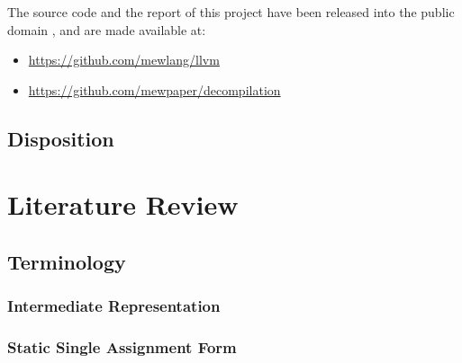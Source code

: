 \documentclass[12pt, a4paper]{article}
\begin{document}
The source code and the report of this project have been released into the
public domain \cite{cc0}, and are made available at:
\begin{itemize}
	\item \url{https://github.com/mewlang/llvm}
	\item \url{https://github.com/mewpaper/decompilation}
\end{itemize}


\subsection{Disposition}



\section{Literature Review}


\subsection{Terminology}



\subsubsection{Intermediate Representation}


\subsubsection{Static Single Assignment Form}


\end{document}
